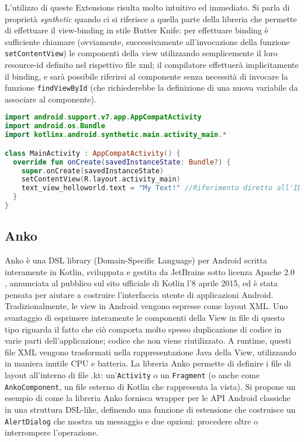 L'utilizzo di queste Extensions risulta molto intuitivo ed immediato. Si parla di proprietà {\em synthetic} quando ci si riferisce a quella parte della libreria che permette di effettuare il view-binding in stile Butter Knife: per effettuare binding è sufficiente chiamare (ovviamente, successivamente all'invocazione della funzione \texttt{setContentView}) le componenti della view utilizzando semplicemente il loro resource-id definito nel rispettivo file xml; il compilatore effettuerà implicitamente il binding, e sarà possibile riferirsi al componente senza necessità di invocare la funzione \texttt{findViewById} (che richiederebbe la definizione di una nuova variabile da associare al componente).\\

\begin{lstlisting}[caption={Utilizzo delle proprietà synthetic di KAE}, captionpos=b, label={lst:exAmpleKAE}, language=Kotlin]
import android.support.v7.app.AppCompatActivity
import android.os.Bundle
import kotlinx.android.synthetic.main.activity_main.*

class MainActivity : AppCompatActivity() {
  override fun onCreate(savedInstanceState: Bundle?) {
    super.onCreate(savedInstanceState)
    setContentView(R.layout.activity_main)
    text_view_helloworld.text = "My Text!" //Riferimento diretto all'ID xml
  }
}
\end{lstlisting}

\subsection{Anko}
Anko è una DSL library (Domain-Specific Language) per Android scritta interamente in Kotlin, sviluppata e gestita da JetBrains sotto licenza Apache 2.0 \cite{anko}, annunciata al pubblico sul sito ufficiale di Kotlin l'8 aprile 2015, ed è stata pensata per aiutare a costruire l'interfaccia utente di applicazioni Android.\\
Tradizionalmente, le view in Android vengono espresse come layout XML. Uno svantaggio di esprimere interamente le componenti della View in file di questo tipo riguarda il fatto che ciò comporta molto spesso duplicazione di codice in varie parti dell'applicazione; codice che non viene riutilizzato. A runtime, questi file XML vengono trasformati nella rappresentazione Java della View, utilizzando in maniera inutile CPU e batteria. La libreria Anko permette di definire i file di layout all'interno di file .kt: un'\texttt{Activity} o un \texttt{Fragment} (o anche come \texttt{AnkoComponent}, un file esterno di Kotlin che rappresenta la vista). Si propone un esempio di come la libreria Anko fornisca wrapper per le API Android classiche in una struttura DSL-like, definendo una funzione di estensione che costruisce un \texttt{AlertDialog} che mostra un messaggio e due opzioni: procedere oltre o interrompere l'operazione.\\

